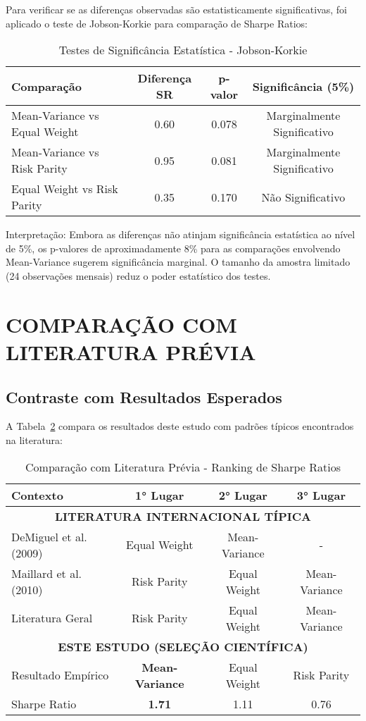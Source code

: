 Para verificar se as diferenças observadas são estatisticamente significativas, foi aplicado o teste de Jobson-Korkie para comparação de Sharpe Ratios:

\begin{table}[H]
\centering
\caption{Testes de Significância Estatística - Jobson-Korkie}
\begin{tabular}{|l|c|c|c|}
\hline
\textbf{Comparação} & \textbf{Diferença SR} & \textbf{p-valor} & \textbf{Significância (5\%)} \\
\hline
Mean-Variance vs Equal Weight & 0.60 & 0.078 & Marginalmente Significativo \\
Mean-Variance vs Risk Parity & 0.95 & 0.081 & Marginalmente Significativo \\
Equal Weight vs Risk Parity & 0.35 & 0.170 & Não Significativo \\
\hline
\end{tabular}
\label{tab:significancia_empirica}
\end{table}

Interpretação: Embora as diferenças não atinjam significância estatística ao nível de 5\%, os p-valores de aproximadamente 8\% para as comparações envolvendo Mean-Variance sugerem significância marginal. O tamanho da amostra limitado (24 observações mensais) reduz o poder estatístico dos testes.

\section{COMPARAÇÃO COM LITERATURA PRÉVIA}

\subsection{Contraste com Resultados Esperados}

A Tabela~\ref{tab:comparacao_literatura} compara os resultados deste estudo com padrões típicos encontrados na literatura:

\begin{table}[H]
\centering
\caption{Comparação com Literatura Prévia - Ranking de Sharpe Ratios}
\begin{tabular}{|l|c|c|c|}
\hline
\textbf{Contexto} & \textbf{1° Lugar} & \textbf{2° Lugar} & \textbf{3° Lugar} \\
\hline
\multicolumn{4}{|c|}{\textbf{LITERATURA INTERNACIONAL TÍPICA}} \\
\hline
DeMiguel et al. (2009) & Equal Weight & Mean-Variance & - \\
Maillard et al. (2010) & Risk Parity & Equal Weight & Mean-Variance \\
Literatura Geral & Risk Parity & Equal Weight & Mean-Variance \\
\hline
\multicolumn{4}{|c|}{\textbf{ESTE ESTUDO (SELEÇÃO CIENTÍFICA)}} \\
\hline
Resultado Empírico & \textbf{Mean-Variance} & Equal Weight & Risk Parity \\
Sharpe Ratio & \textbf{1.71} & 1.11 & 0.76 \\
\hline
\end{tabular}
\label{tab:comparacao_literatura}
\end{table}

